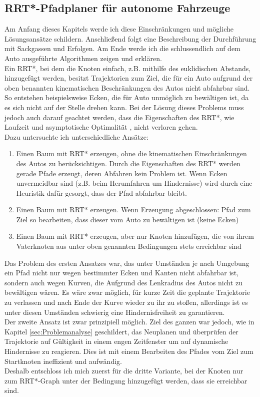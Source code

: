 \subsection{RRT*-Pfadplaner für autonome Fahrzeuge}
Am Anfang dieses Kapitels werde ich diese Einschränkungen und mögliche Lösungsansätze schildern. Anschließend folgt eine Beschreibung der Durchführung mit Sackgassen und Erfolgen. Am Ende werde ich die schlussendlich auf dem Auto ausgeführte Algorithmen zeigen und erklären.  \\
Ein RRT*, bei dem die Knoten einfach, z.B. mithilfe des euklidischen Abstands, hinzugefügt werden, besitzt Trajektorien zum Ziel, die für ein Auto aufgrund der oben benannten kinematischen Beschränkungen des Autos nicht abfahrbar sind. So entstehen beispielsweise Ecken, die für Auto unmöglich zu bewältigen ist, da es sich nicht auf der Stelle drehen kann. Bei der Lösung dieses Problems muss jedoch auch darauf geachtet werden, dass die Eigenschaften des RRT*, wie Laufzeit und asymptotische Optimalität \citep{KaFra10}, nicht verloren gehen.\\
Dazu untersuchte ich unterschiedliche Ansätze:
\begin{enumerate}
\item Einen Baum mit RRT* erzeugen, ohne die kinematischen Einschränkungen des Autos zu berücksichtigen. Durch die Eigenschaften des RRT* werden gerade Pfade erzeugt, deren Abfahren kein Problem ist. Wenn Ecken unvermeidbar sind (z.B. beim Herumfahren um Hindernisse) wird durch eine Heuristik dafür gesorgt, dass der Pfad abfahrbar bleibt.
\item Einen Baum mit RRT* erzeugen. Wenn Erzeugung abgeschlossen: Pfad zum Ziel so bearbeiten, dass dieser vom Auto zu bewältigen ist (keine Ecken)
\item Einen Baum mit RRT* erzeugen, aber nur Knoten hinzufügen, die von ihrem Vaterknoten aus unter oben genannten Bedingungen stets erreichbar sind

\end{enumerate}
Das Problem des ersten Ansatzes war, das unter Umständen je nach Umgebung ein Pfad nicht nur wegen bestimmter Ecken und Kanten nicht abfahrbar ist, sondern auch wegen Kurven, die Aufgrund des Lenkradius des Autos nicht zu bewältigen wären. Es wäre zwar möglich, für kurze Zeit die geplante Trajektorie zu verlassen und nach Ende der Kurve wieder zu ihr zu stoßen, allerdings ist es unter diesen Umständen schwierig eine Hindernisfreiheit zu garantieren. \\
Der zweite Ansatz ist zwar prinzipiell möglich. Ziel des ganzen war jedoch, wie in Kapitel \ref{sec:Problemanalyse} geschildert, das Neuplanen und überprüfen der Trajektorie auf Gültigkeit in einem engen Zeitfenster um auf dynamische Hindernisse zu reagieren. Dies ist mit einem Bearbeiten des Pfades vom Ziel zum Startknoten ineffizient und aufwändig.\\
Deshalb entschloss ich mich zuerst für die dritte Variante, bei der Knoten nur zum RRT*-Graph unter der Bedingung hinzugefügt werden, dass sie erreichbar sind.
